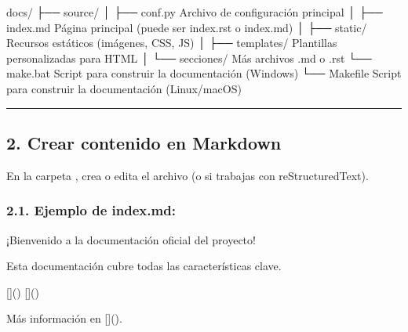 \documentclass[a4paper,10pt,oneside,spanish,openany]{sphinxmanual}
\begin{document}
\begin{sphinxVerbatim}[commandchars=\\\{\}]
docs/
├── source/
│   ├── conf.py        \PYGZlt{}\PYGZhy{} Archivo de configuración principal
│   ├── index.md       \PYGZlt{}\PYGZhy{} Página principal (puede ser index.rst o index.md)
│   ├── \PYGZus{}static/       \PYGZlt{}\PYGZhy{} Recursos estáticos (imágenes, CSS, JS)
│   ├── \PYGZus{}templates/    \PYGZlt{}\PYGZhy{} Plantillas personalizadas para HTML
│   └── secciones/     \PYGZlt{}\PYGZhy{} Más archivos .md o .rst
└── make.bat          \PYGZlt{}\PYGZhy{} Script para construir la documentación (Windows)
└── Makefile          \PYGZlt{}\PYGZhy{} Script para construir la documentación (Linux/macOS)
\end{sphinxVerbatim}


\bigskip\hrule\bigskip



\subsection{2. Crear contenido en Markdown}
\label{\detokenize{configuracion_inicial/008.Generar_HTML:crear-contenido-en-markdown}}
\sphinxAtStartPar
En la carpeta , crea o edita el archivo  (o  si trabajas con reStructuredText).


\subsubsection{2.1. Ejemplo de index.md:}
\label{\detokenize{configuracion_inicial/008.Generar_HTML:ejemplo-de-index-md}}
\begin{sphinxVerbatim}[commandchars=\\\{\}]

¡Bienvenido a la documentación oficial del proyecto!


Esta documentación cubre todas las características clave.


[]()
[]()


Más información en []().
\end{sphinxVerbatim}
\end{document}
